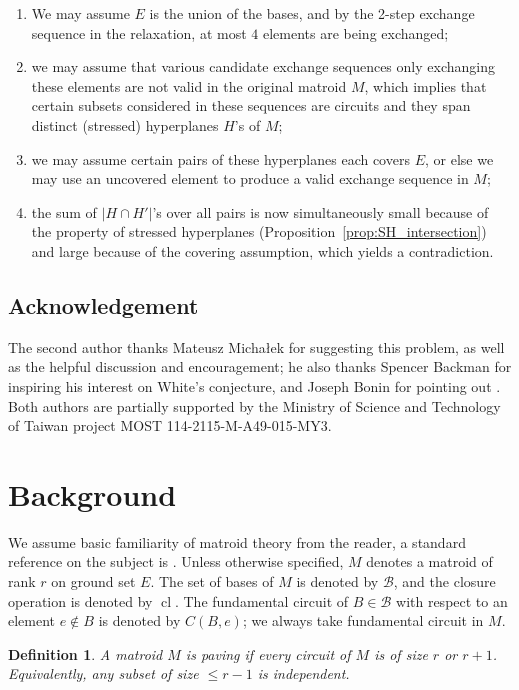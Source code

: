 \documentclass{amsart}
\newtheorem{definition}[theorem]{Definition}
\newcommand\Bcal{{\mathcal B}}
\DeclareMathOperator{\cl}{cl}
\begin{document}
\begin{enumerate}
    \item We may assume $E$ is the union of the bases, and by the 2-step exchange sequence in the relaxation, at most $4$ elements are being exchanged;
    \item we may assume that various candidate exchange sequences only exchanging these elements are not valid in the original matroid $M$, which implies that certain subsets considered in these sequences are circuits and they span distinct (stressed) hyperplanes $H$'s of $M$;
    \item we may assume certain pairs of these hyperplanes each covers $E$, or else we may use an uncovered element to produce a valid exchange sequence in $M$;
    \item the sum of $|H\cap H'|$'s over all pairs is now simultaneously small because of the property of stressed hyperplanes (Proposition~\ref{prop:SH_intersection}) and large because of the covering assumption, which yields a contradiction.
\end{enumerate}

\subsection*{Acknowledgement}
The second author thanks Mateusz Micha\l ek for suggesting this problem, as well as the helpful discussion and encouragement; he also thanks Spencer Backman for inspiring his interest on White's conjecture, and Joseph Bonin for pointing out \cite{bonin2008}. Both authors are partially supported by the Ministry of Science and Technology of Taiwan project MOST 114-2115-M-A49-015-MY3.

\section{Background}

We assume basic familiarity of matroid theory from the reader, a standard reference on the subject is \cite{Oxley}.
Unless otherwise specified, $M$ denotes a matroid of rank $r$ on ground set $E$. The set of bases of $M$ is denoted by $\Bcal$, and the closure operation is denoted by $\cl$. The fundamental circuit of $B\in\Bcal$ with respect to an element $e\not\in B$ is denoted by $C(B,e)$; we always take fundamental circuit in $M$.

\begin{definition}
    A matroid $M$ is {\em paving} if every circuit of $M$ is of size $r$ or $r+1$. Equivalently, any subset of size $\leq r-1$ is independent.
\end{definition}
\end{document}
